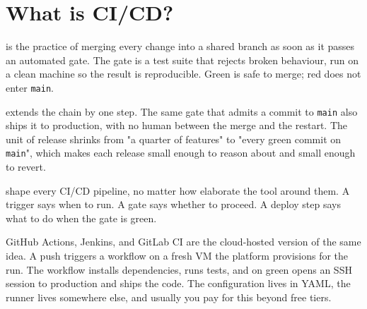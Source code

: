 \newpage
\section{What is CI/CD?}

 is the practice of merging
every change into a shared branch as soon as it passes an automated
gate.
The gate is a test suite that rejects broken behaviour, run on a
clean machine so the result is reproducible.
Green is safe to merge; red does not enter \texttt{main}.


 extends the chain by one
step.
The same gate that admits a commit to \texttt{main} also ships it to
production, with no human between the merge and the restart.
The unit of release shrinks from "a quarter of features" to "every
green commit on \texttt{main}", which makes each release small
enough to reason about and small enough to revert.


 shape every CI/CD pipeline, no matter how
elaborate the tool around them.
A trigger says when to run.
A gate says whether to proceed.
A deploy step says what to do when the gate is green.


GitHub Actions, Jenkins, and GitLab CI are the cloud-hosted version
of the same idea.
A push triggers a workflow on a fresh VM the platform provisions for
the run.
The workflow installs dependencies, runs tests, and on green opens
an SSH session to production and ships the code.
The configuration lives in YAML, the runner lives somewhere else,
and usually you pay for this beyond free tiers.


